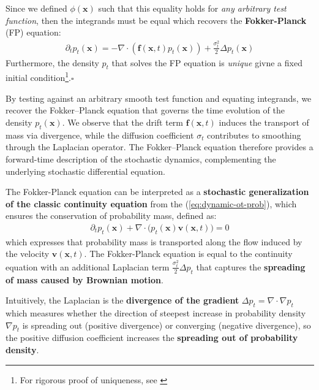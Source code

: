 \documentclass{article}
\begin{document}
Since we defined $\phi(\boldsymbol{x})$ such that this equality holds for \textit{any arbitrary test function}, then the integrands must be equal which recovers the \textbf{Fokker-Planck} (FP) equation:
\begin{align}
    \boxed{\partial_tp_t(\boldsymbol{x})=-\nabla\cdot (\boldsymbol{f}(\boldsymbol{x},t) p_t(\boldsymbol{x}))+\frac{\sigma_t^2}{2}\Delta p_t(\boldsymbol{x})}\tag{Fokker-Planck Equation}
\end{align}
Furthermore, the density $p_t$ that solves the FP equation is \textit{unique} givne a fixed initial condition\footnote{For rigorous proof of uniqueness, see \citet{bogachev2021uniqueness}}.\hfill $\square$

By testing against an arbitrary smooth test function and equating integrands, we recover the Fokker–Planck equation that governs the time evolution of the density $p_t(\boldsymbol{x})$. We observe that the drift term $\boldsymbol{f}(\boldsymbol{x},t)$ induces the transport of mass via divergence, while the diffusion coefficient $\sigma_t$ contributes to smoothing through the Laplacian operator. The Fokker–Planck equation therefore provides a forward-time description of the stochastic dynamics, complementing the underlying stochastic differential equation.

\begin{remark}\label{remark:fokker-planck-continuity}
The Fokker-Planck equation can be interpreted as a \textbf{stochastic generalization of the classic continuity equation} from the (\ref{eq:dynamic-ot-prob}), which ensures the conservation of probability mass, defined as:
\begin{align}
    \partial_t p_t(\boldsymbol{x}) + \nabla \cdot \big(p_t(\boldsymbol{x}) \boldsymbol{v}(\boldsymbol{x},t)\big) = 0\tag{Continuity Equation}\label{eq:continuity-equation-remark}
\end{align}
which expresses that probability mass is transported along the flow induced by the velocity $\boldsymbol{v}(\boldsymbol{x},t)$. The Fokker-Planck equation is equal to the continuity equation with an additional Laplacian term $\frac{\sigma_t^2}{2}\Delta p_t$ that captures the \textbf{spreading of mass caused by Brownian motion}. 

Intuitively, the Laplacian is the \textbf{divergence of the gradient} $\Delta p_t=\nabla\cdot\nabla p_t$ which measures whether the direction of steepest increase in probability density $\nabla p_t$ is spreading out (positive divergence) or converging (negative divergence), so the positive diffusion coefficient increases the \textbf{spreading out of probability density}.
\end{remark}
\end{document}
